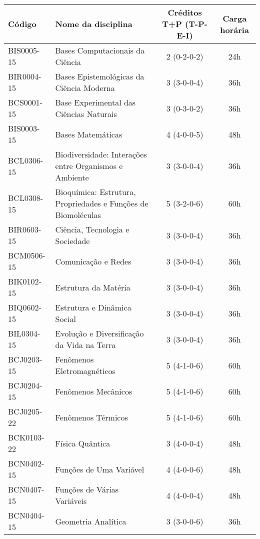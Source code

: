 \begin{table}[h!]
    \centering
    \begin{tabular}{|l|p{}|c|c|}
        \hline
        \textbf{Código} & \textbf{Nome da disciplina} & \textbf{Créditos T+P (T-P-E-I)} & \textbf{Carga horária}\\
        \hline\hline
        BIS0005-15 & Bases Computacionais da Ciência & 2 (0-2-0-2) & 24h\\
        \hline
        BIR0004-15 & Bases Epistemológicas da Ciência Moderna & 3 (3-0-0-4) & 36h\\
        \hline
        BCS0001-15 & Base Experimental das Ciências Naturais & 3 (0-3-0-2) & 36h\\
        \hline
        BIS0003-15 & Bases Matemáticas & 4 (4-0-0-5) & 48h\\
        \hline
        BCL0306-15 & Biodiversidade: Interações entre Organismos e Ambiente & 3 (3-0-0-4) & 36h\\
        \hline
        BCL0308-15 & Bioquímica: Estrutura, Propriedades e Funções de Biomoléculas & 5 (3-2-0-6) & 60h\\
        \hline
        BIR0603-15 & Ciência, Tecnologia e Sociedade & 3 (3-0-0-4) & 36h\\
        \hline
        BCM0506-15 & Comunicação e Redes & 3 (3-0-0-4) & 36h\\
        \hline
        BIK0102-15 & Estrutura da Matéria & 3 (3-0-0-4) & 36h\\
        \hline
        BIQ0602-15 & Estrutura e Dinâmica Social & 3 (3-0-0-4) & 36h \\
        \hline
        BIL0304-15 & Evolução e Diversificação da Vida na Terra & 3 (3-0-0-4) & 36h\\
        \hline
        BCJ0203-15 & Fenômenos Eletromagnéticos & 5 (4-1-0-6) & 60h\\
        \hline
        BCJ0204-15 & Fenômenos Mecânicos & 5 (4-1-0-6) & 60h \\
        \hline
        BCJ0205-22 & Fenômenos Térmicos & 5 (4-1-0-6) & 60h\\
        \hline
        BCK0103-22 & Física Quântica & 3 (4-0-0-4) & 48h\\
        \hline
        BCN0402-15 & Funções de Uma Variável & 4 (4-0-0-6) & 48h\\
        \hline
        BCN0407-15 & Funções de Várias Variáveis & 4 (4-0-0-4) & 48h \\
        \hline
        BCN0404-15 & Geometria Analítica & 3 (3-0-0-6) & 36h\\
        \hline

\end{tabular}
\end{table}
